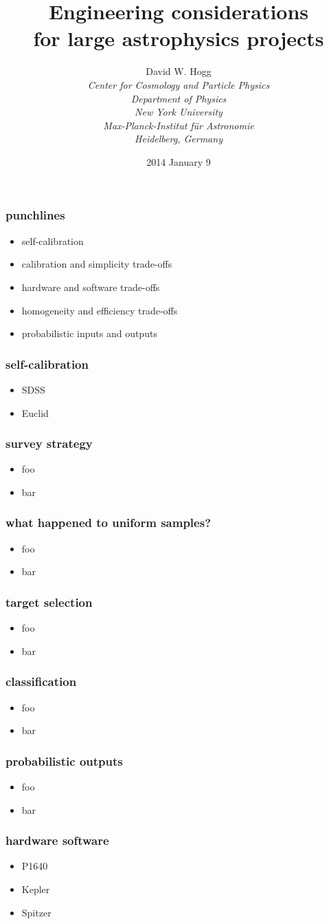 \documentclass[pdftex]{beamer}
\title{Engineering considerations\\ for large astrophysics projects}
\author[David W. Hogg (NYU)]{David W. Hogg \\[1ex]
  \textsl{\small Center for Cosmology and Particle Physics\\
                 Department of Physics\\
                 New York University\\[1ex]
                 Max-Planck-Institut f\"ur Astronomie\\
                 Heidelberg, Germany}}
\date{2014 January 9}
\newcommand{\conclusionslide}{
\begin{frame}
  \frametitle{punchlines}
  \begin{itemize}
  \item self-calibration
  \item calibration and simplicity trade-offs
  \item hardware and software trade-offs
  \item homogeneity and efficiency trade-offs
  \item probabilistic inputs and outputs
  \end{itemize}
\end{frame}
}
\begin{document}
\begin{frame}
  \titlepage
\end{frame}

\conclusionslide

\begin{frame}
  \frametitle{self-calibration}
  \begin{itemize}
  \item SDSS
  \item Euclid
  \end{itemize}
\end{frame}

\begin{frame}
  \frametitle{survey strategy}
  \begin{itemize}
  \item foo
  \item bar
  \end{itemize}
\end{frame}

\begin{frame}
  \frametitle{what happened to uniform samples?}
  \begin{itemize}
  \item foo
  \item bar
  \end{itemize}
\end{frame}

\begin{frame}
  \frametitle{target selection}
  \begin{itemize}
  \item foo
  \item bar
  \end{itemize}
\end{frame}

\begin{frame}
  \frametitle{classification}
  \begin{itemize}
  \item foo
  \item bar
  \end{itemize}
\end{frame}

\begin{frame}
  \frametitle{probabilistic outputs}
  \begin{itemize}
  \item foo
  \item bar
  \end{itemize}
\end{frame}

\begin{frame}
  \frametitle{hardware  software}
  \begin{itemize}
  \item P1640
  \item Kepler
  \item Spitzer
  \end{itemize}
\end{frame}
\end{document}
